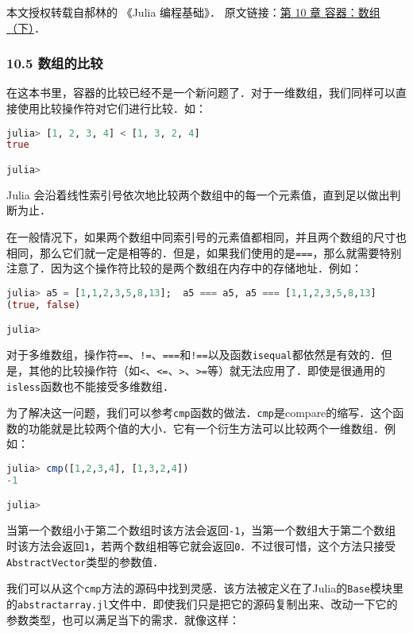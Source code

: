 
本文授权转载自郝林的 《Julia 编程基础》． 原文链接：\href{https://github.com/hyper0x/JuliaBasics/blob/master/book/ch10.md}{第 10 章 容器：数组（下）}．


\subsubsection{10.5 数组的比较}

在这本书里，容器的比较已经不是一个新问题了．对于一维数组，我们同样可以直接使用比较操作符对它们进行比较．如：

\begin{lstlisting}[language=julia]
julia> [1, 2, 3, 4] < [1, 3, 2, 4]
true

julia> 
\end{lstlisting}

Julia 会沿着线性索引号依次地比较两个数组中的每一个元素值，直到足以做出判断为止．

在一般情况下，如果两个数组中同索引号的元素值都相同，并且两个数组的尺寸也相同，那么它们就一定是相等的．但是，如果我们使用的是\verb|===|，那么就需要特别注意了．因为这个操作符比较的是两个数组在内存中的存储地址．例如：

\begin{lstlisting}[language=julia]
julia> a5 = [1,1,2,3,5,8,13];  a5 === a5, a5 === [1,1,2,3,5,8,13]
(true, false)

julia> 
\end{lstlisting}

对于多维数组，操作符\verb|==|、\verb|!=|、\verb|===|和\verb|!==|以及函数\verb|isequal|都依然是有效的．但是，其他的比较操作符（如\verb|<|、\verb|<=|、\verb|>|、\verb|>=|等）就无法应用了．即使是很通用的\verb|isless|函数也不能接受多维数组．

为了解决这一问题，我们可以参考\verb|cmp|函数的做法．\verb|cmp|是compare的缩写．这个函数的功能就是比较两个值的大小．它有一个衍生方法可以比较两个一维数组．例如：

\begin{lstlisting}[language=julia]
julia> cmp([1,2,3,4], [1,3,2,4])
-1

julia> 
\end{lstlisting}

当第一个数组小于第二个数组时该方法会返回\verb|-1|，当第一个数组大于第二个数组时该方法会返回\verb|1|，若两个数组相等它就会返回\verb|0|．不过很可惜，这个方法只接受\verb|AbstractVector|类型的参数值．

我们可以从这个\verb|cmp|方法的源码中找到灵感．该方法被定义在了Julia的\verb|Base|模块里的\verb|abstractarray.jl|文件中．即使我们只是把它的源码复制出来、改动一下它的参数类型，也可以满足当下的需求．就像这样：

